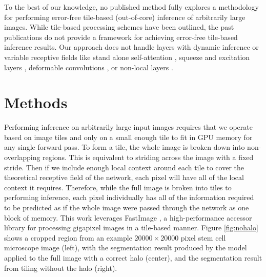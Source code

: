 \documentclass[10pt, indentfirst]{article}
\begin{document}
To the best of our knowledge, no published method fully explores a methodology for performing error-free tile-based (out-of-core) inference of arbitrarily large images.
While tile-based processing schemes have been outlined, the past publications do not provide a framework for achieving error-free tile-based inference results.
Our approach does not handle layers with dynamic inference or variable receptive fields like stand alone self-attention \citep{Ramachandran2019b}, squeeze and excitation layers \citep{Hu2018}, deformable convolutions \citep{Dai2017}, or non-local layers \citep{Wang2018c}.


\section{Methods}
\label{methods}

Performing inference on arbitrarily large input images requires that we operate based on image tiles and only on a small enough tile to fit in GPU memory for any single forward pass.
To form a tile, the whole image is broken down into non-overlapping regions.
This is equivalent to striding across the image with a fixed stride.
Then if we include enough local context around each tile to cover the theoretical receptive field of the network, each pixel will have all of the local context it requires.
Therefore, while the full image is broken into tiles to performing inference, each pixel individually has all of the information required to be predicted as if the whole image were passed through the network as one block of memory.
This work leverages FastImage \citep{Bardakoff2019}, a high-performance accessor library for processing gigapixel images in a tile-based manner.
Figure \ref{fig:nohalo} shows a cropped region from an example $\num{20000} \times \num{20000}$ pixel stem cell microscope image (left), with the segmentation result produced by the model applied to the full image with a correct halo (center), and the segmentation result from tiling without the halo (right).
\end{document}
